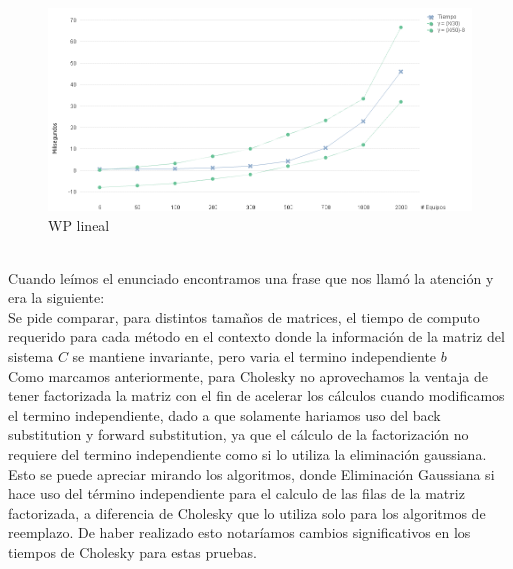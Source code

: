 \begin{figure}[H]
    \centering
    \includegraphics[width=1\textwidth]{IMG/wp lineal.png}
    \caption{WP lineal}
    \label{fig:WP lineal}
\end{figure}

\\
Cuando leímos el enunciado encontramos una frase que nos llamó la atención y era la siguiente: \\

Se pide comparar, para distintos tamaños de matrices, el tiempo de computo requerido para cada método en el contexto donde la información de la matriz del sistema $C$ se mantiene invariante,
pero varia el termino independiente $b$ \\

Como marcamos anteriormente, para Cholesky no aprovechamos la ventaja de tener factorizada la matriz con el fin de acelerar los cálculos cuando modificamos el termino independiente, dado a que solamente hariamos uso del back substitution y forward substitution, ya que el cálculo de la factorización no requiere del termino independiente como si lo utiliza la eliminación gaussiana. Esto se puede apreciar mirando los algoritmos, donde Eliminación Gaussiana si hace uso del término independiente para el calculo de las filas de la matriz factorizada, a diferencia de Cholesky que lo utiliza solo para los algoritmos de reemplazo. De haber realizado esto notaríamos cambios significativos en los tiempos de Cholesky para estas pruebas.

